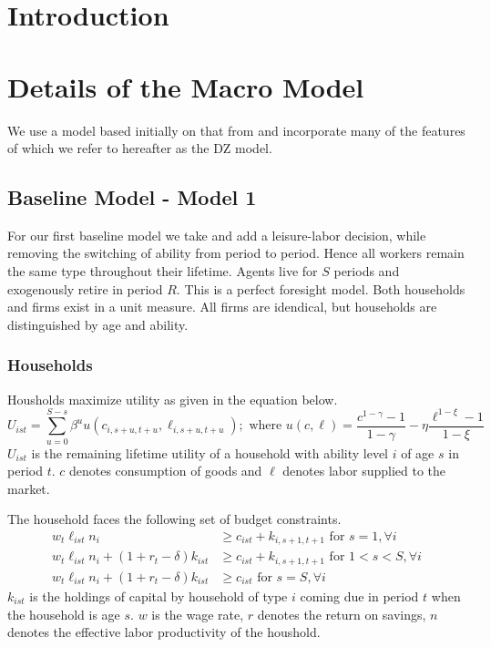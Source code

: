 \documentclass[letterpaper,12pt]{article}
\theoremstyle{definition}
\numberwithin{equation}{section}
\begin{document}
\begin{spacing}{1.5}


\section{Introduction}\label{Sec_Intro}

\section{Details of the Macro Model}\label{Sec_Macro}

  We use a model based initially on that from \citet{EvansPhillips2014} and incorporate many of the features of \citet{ZodrowDiamond:2013} which we refer to hereafter as the DZ model.

  \subsection{Baseline Model - Model 1}\label{SubSec_Macro_Base}
    For our first baseline model we take \citet{EvansPhillips2014} and add a leisure-labor decision, while removing the switching of ability from period to period.  Hence all workers remain the same type throughout their lifetime.  Agents live for $S$ periods and exogenously retire in period $R$.  This is a perfect foresight model.  Both households and firms exist in a unit measure.  All firms are idendical, but households are distinguished by age and ability.

    \subsubsection{Households}
      Housholds maximize utility as given in the equation below.
      \begin{equation}\label{Macro_Base_Utility}
      U_{ist} = \sum_{u=0}^{S-s}\beta^u u(c_{i,s+u,t+u},\ell_{i,s+u,t+u});\text{ where }u(c,\ell) = \frac{c^{1-\gamma}-1}{1-\gamma} - \eta \frac{\ell^{1-\xi}-1}{1-\xi} \nonumber
      \end{equation} 
      $U_{ist}$ is the remaining lifetime utility of a household with ability level $i$ of age $s$ in period $t$.  $c$ denotes consumption of goods and $\ell$ denotes labor supplied to the market.

      The household faces the following set of budget constraints.
      \begin{align}
      w_t \ell_{ist} n_i & \ge c_{ist} + k_{i,s+1,t+1} \text{     for } s=1,\forall i \label{Macro_Base_BC1}\\
      w_t \ell_{ist} n_i + (1+r_t-\delta)k_{ist} & \ge c_{ist} + k_{i,s+1,t+1} \text{     for } 1<s<S,\forall i \label{Macro_Base_BC2}\\
      w_t \ell_{ist} n_i + (1+r_t-\delta)k_{ist} & \ge c_{ist} \text{     for } s=S,\forall i \label{Macro_Base_BC3}
      \end{align}
      $k_{ist}$ is the holdings of capital by household of type $i$ coming due in period $t$ when the household is age $s$. $w$ is the wage rate, $r$ denotes the return on savings, $n$ denotes the effective labor productivity of the houshold.


\end{spacing}
\end{document}
